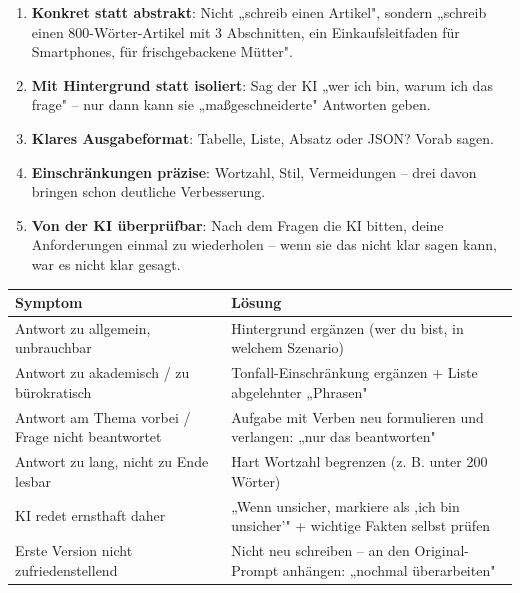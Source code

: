 \begin{enumerate}
  \item \textbf{Konkret statt abstrakt}: Nicht „schreib einen Artikel", sondern „schreib einen 800-Wörter-Artikel mit 3 Abschnitten, ein Einkaufsleitfaden für Smartphones, für frischgebackene Mütter".
  \item \textbf{Mit Hintergrund statt isoliert}: Sag der KI „wer ich bin, warum ich das frage" – nur dann kann sie „maßgeschneiderte" Antworten geben.
  \item \textbf{Klares Ausgabeformat}: Tabelle, Liste, Absatz oder JSON? Vorab sagen.
  \item \textbf{Einschränkungen präzise}: Wortzahl, Stil, Vermeidungen – drei davon bringen schon deutliche Verbesserung.
  \item \textbf{Von der KI überprüfbar}: Nach dem Fragen die KI bitten, deine Anforderungen einmal zu wiederholen – wenn sie das nicht klar sagen kann, war es nicht klar gesagt.
\end{enumerate}


\begin{center}
\begin{tabularx}{\linewidth}{|X|X|}
\hline
\textbf{Symptom} & \textbf{Lösung} \tabularnewline
\hline
Antwort zu allgemein, unbrauchbar & Hintergrund ergänzen (wer du bist, in welchem Szenario) \tabularnewline
Antwort zu akademisch / zu bürokratisch & Tonfall-Einschränkung ergänzen + Liste abgelehnter „Phrasen" \tabularnewline
Antwort am Thema vorbei / Frage nicht beantwortet & Aufgabe mit Verben neu formulieren und verlangen: „nur das beantworten" \tabularnewline
Antwort zu lang, nicht zu Ende lesbar & Hart Wortzahl begrenzen (z. B. unter 200 Wörter) \tabularnewline
KI redet ernsthaft daher & „Wenn unsicher, markiere als ‚ich bin unsicher'" + wichtige Fakten selbst prüfen \tabularnewline
Erste Version nicht zufriedenstellend & Nicht neu schreiben – an den Original-Prompt anhängen: „nochmal überarbeiten" \tabularnewline
\hline
\end{tabularx}
\end{center}


